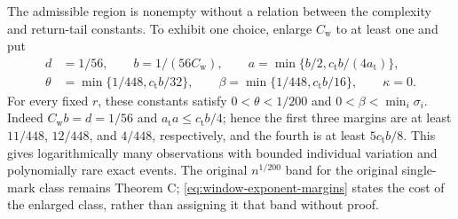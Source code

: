 The admissible region is nonempty without a relation between the
complexity and return-tail constants. To exhibit one choice, enlarge
$C_{\mathrm w}$ to at least one and put
\begin{equation}\label{eq:nonempty-window-budget}
 \begin{split}
 d&=1/56,\qquad b=1/(56C_{\mathrm w}),\qquad
 a=\min\{b/2,c_{\mathrm t}b/(4a_{\mathrm t})\},\\
 \theta&=\min\{1/448,c_{\mathrm t}b/32\},\qquad
 \beta=\min\{1/448,c_{\mathrm t}b/16\},\qquad \kappa=0.
 \end{split}
\end{equation}
For every fixed $r$, these constants satisfy
$0<\theta<1/200$ and $0<\beta<\min_i\sigma_i$.
Indeed $C_{\mathrm w}b=d=1/56$ and
$a_{\mathrm t}a\le c_{\mathrm t}b/4$; hence the first three margins
are at least $11/448$, $12/448$, and $4/448$, respectively, and the
fourth is at least $5c_{\mathrm t}b/8$. This gives logarithmically
many observations with bounded individual variation and polynomially
rare exact events. The original $n^{1/200}$ band for the original
single-mark class remains Theorem C; \eqref{eq:window-exponent-margins}
states the cost of the enlarged class, rather than assigning it that
band without proof.

